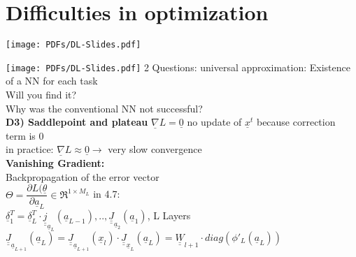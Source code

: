 
\section{Difficulties in optimization }
\texttt{[image: PDFs/DL-Slides.pdf]}

\texttt{[image: PDFs/DL-Slides.pdf]}
2 Questions:
\textbullet universal approximation: Existence of a NN for each task\\
Will you find it?\\
\textbullet Why was the conventional NN not successful? \\
\textbf{D3) Saddlepoint and plateau}
$  \underline{\nabla} L = \underline{0}  $ no update of $  \underline{x}^t $ because correction term is 0\\
in practice: $  \underline{\nabla} L \approx \underline{0} \rightarrow  $ very slow convergence\\
 \textbf{Vanishing Gradient:}\\
 Backpropagation of the error vector \\
 $  \Theta = \dfrac{\partial L (\underline{\theta}}{\partial \underline{a}_L} \in \Re^{1 \times M_L} $ in 4.7:\\
 $  \underline{\delta}_1^T = \underline{ \delta}_L ^T \cdot \underline{\underline{j}}_{\underline{a}_L} (\underline{a}_{L-1}),.., \underline{\underline{J}}_{\underline{a}_2} (\underline{a}_1) $, L Layers\\
 $ \underline{\underline{J}}_{\underline{a}_{L+1}} (\underline{a}_L) = \underline{\underline{J}}_{\underline{a}_{L+1}} (\underline{x}_l) \cdot \underline{\underline{J}}_{\underline{x}_L} (\underline{a}_L) = \underline{\underline{W}}_{l+1} \cdot diag( \phi'_{L} (\underline{a}_L))   $\\
